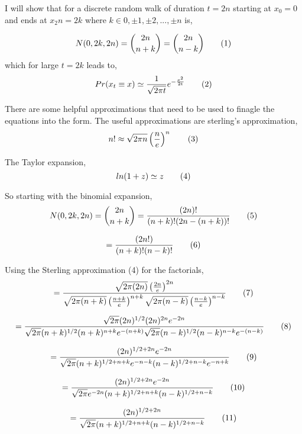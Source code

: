 I will show that for a discrete random walk of duration $t=2n$ starting at $x_0=0$ and ends at $x_2n=2k$ where $k \in {0, \pm 1, \pm 2, ..., \pm n}$ is,

\[
    N(0, 2k, 2n) = 
        \binom{2n}{n + k}
        =
        \binom{2n}{n - k}
        \addtag
\]
which for large $t = 2k$ leads to,
\[
    Pr(x_t \equiv x) \simeq
        \frac{1}{\sqrt{2 \pi t}}
        e^{
            -\frac{x^2}{2t}
        }
    \addtag
\]

There are some helpful approximations that need to be used to finagle the equations into the form. The useful approximations are sterling's approximation,
\[
    n! \approx 
        \sqrt{2 \pi n}
        \left(
            \frac{n}{e}
        \right)^n
    \addtag
\]

The Taylor expansion,
\[
    ln(1 + z) \simeq z
    \addtag
\]

So starting with the binomial expansion,
\[
    N(0, 2k, 2n) = 
        \binom{2n}{n + k}
        =
        \frac
        {
            (2n)!
        }
        {
        (n + k)!
        (2n - (n + k))!
        }
        \addtag
\]

\[
    =
    \frac
    {
        (2n!)
    }
    {
        (n + k)!
        (n - k)!
    }
    \addtag
\]

Using the Sterling approximation (4) for the factorials,
\[
    =
    \frac
    {
        \sqrt{2\pi(2n)}
        \left(
            \frac{2n}{e}
        \right)^{2n}
    }
    {
        \sqrt{2\pi(n + k)}
        \left(
            \frac{n + k}{e}
        \right)^{n + k}
        \sqrt{2\pi(n - k)}
        \left(
            \frac{n - k}{e}
        \right)^{n - k}
    }
    \addtag
\]

\[
    =
    \frac
    {
        \sqrt{2\pi}
        (2n)^{1/2}
        (2n)^{2n}
        e^{-2n}
    }
    {
        \sqrt{2\pi}
        (n + k)^{1/2}
        (n + k)^{n + k}
        e^{-(n + k)}
        \sqrt{2\pi}
        (n - k)^{1/2}
        (n - k)^{n - k}
        e^{-(n - k)}
    }
    \addtag
\]

\[
    =
    \frac
    {
        (2n)^{1/2 + 2n}
        e^{-2n}
    }
    {
        \sqrt{2\pi}
        (n + k)^{1/2 + n + k}
        e^{-n - k}
        (n - k)^{1/2 + n - k}
        e^{-n + k}
    }
    \addtag
\]

\[
    =
    \frac
    {
        (2n)^{1/2 + 2n}
        e^{-2n}
    }
    {
        \sqrt{2\pi}
        e^{-2n}
        (n + k)^{1/2 + n + k}
        (n - k)^{1/2 + n - k}
    }
    \addtag
\]

\[
    =
    \frac
    {
        (2n)^{1/2 + 2n}
    }
    {
        \sqrt{2\pi}
        (n + k)^{1/2 + n + k}
        (n - k)^{1/2 + n - k}
    }
    \addtag
\]